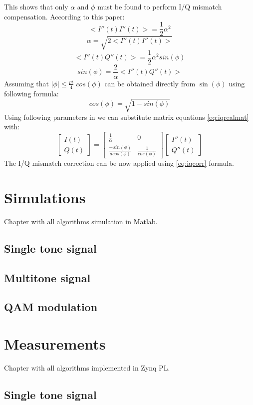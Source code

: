 \documentclass[en,printmode]{mgr}
\begin{document}
		This shows that only $\alpha$ and $\phi$ must be found to perform I/Q mismatch
		compensation. According to this paper:
		\[
			<I''(t)I''(t)> = \frac{1}{2}\alpha^2
		\]
		\[
			\alpha = \sqrt{2<I''(t)I''(t)>}
		\]
		\[
			<I''(t)Q''(t)> = \frac{1}{2}\alpha^2sin(\phi)
		\]
		\[
			sin(\phi)= \frac{2}{\alpha}<I''(t)Q''(t)>
		\]
		Assuming that $|\phi| \leq \frac{pi}{4}$ $cos(\phi)$ can be obtained directly from
		$\sin(\phi)$ using following formula:
		\[
		 	cos(\phi) = \sqrt{1-sin(\phi)}
		\]
		Using following parameters in we can substitute matrix equations \ref{eq:iqrealmat} with:
		\begin{equation}
			\begin{bmatrix} 
				I(t) \\
				Q(t)
			\end{bmatrix}
			=
			\begin{bmatrix}
				\frac{1}{\alpha} & 0 \\
				\frac{-sin(\phi)}{acos(\phi)} & \frac{1}{cos(\phi)}
			\end{bmatrix}
			\begin{bmatrix}
				I''(t) \\
				Q''(t)
			\end{bmatrix}\label{eq:iqcorr}
		\end{equation}
		The I/Q mismatch correction  can be now applied using \ref{eq:iqcorr} formula.
\chapter{Simulations}
Chapter with all algorithms simulation in Matlab.
	\section{Single tone signal}
	\section{Multitone signal}
	\section{QAM modulation}
	
\chapter{Measurements}
Chapter with all algorithms implemented in Zynq PL.
	\section{Single tone signal}
\end{document}
